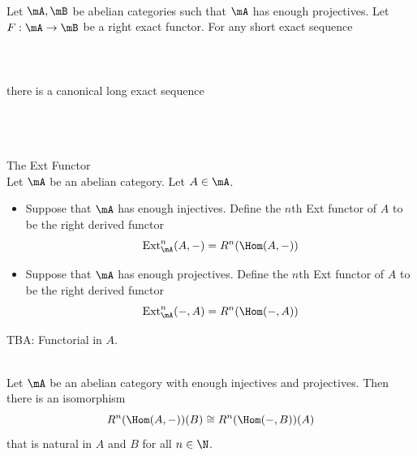 \documentclass[a4paper]{article}
\begin{document}
\begin{prp}{}{}\\
Let $\mA,\mB$ be abelian categories such that $\mA$ has enough projectives. Let $F:\mA\to\mB$ be a right exact functor. For any short exact sequence \\~\\
\\~\\
there is a canonical long exact sequence \\~\\
\\~\\
\end{prp}

\begin{defn}{The Ext Functor}{}\\
Let $\mA$ be an abelian category. Let $A\in\mA$. 
\begin{itemize}
\item Suppose that $\mA$ has enough injectives. Define the $n$th Ext functor of $A$ to be the right derived functor $$\text{Ext}_\mA^n(A,-)=R^n(\Hom(A,-))$$
\item Suppose that $\mA$ has enough projectives. Define the $n$th Ext functor of $A$ to be the right derived functor $$\text{Ext}_\mA^n(-,A)=R^n(\Hom(-,A))$$
\end{itemize}
\end{defn}

TBA: Functorial in $A$. 

\begin{prp}{}{}\\
Let $\mA$ be an abelian category with enough injectives and projectives. Then there is an isomorphism $$R^n(\Hom(A,-))(B)\cong R^n(\Hom(-,B))(A)$$ that is natural in $A$ and $B$ for all $n\in\N$. 
\end{prp}
\end{document}
